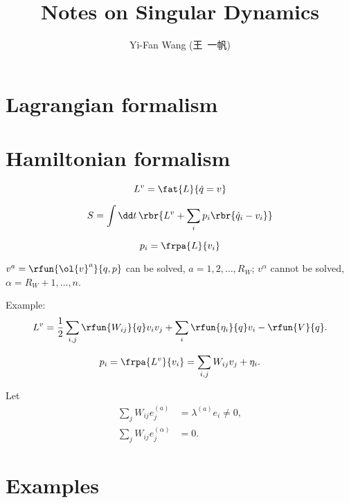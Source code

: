 \documentclass[a4paper,10pt]{article}
\title{Notes on Singular Dynamics}
\author{Yi-Fan Wang (王\ 一帆)}
\begin{document}
\maketitle

\section{Lagrangian formalism}

\section{Hamiltonian formalism}

\begin{equation}
L^v = \fat{L}{\dot{q} = v}
\end{equation}

\begin{equation}
S = \int\dd t\,\rbr{L^v + \sum_i p_i\rbr{\dot{q}_i-v_i}}
\end{equation}

\begin{equation}
p_i = \frpa{L}{v_i}
\end{equation}

$v^a = \rfun{\ol{v}^a}{q,p}$ can be solved, $a = 1, 2, \ldots, R_W$; $v^\alpha$ 
cannot be solved, $\alpha = R_W + 1, \ldots, n$.

Example:
\begin{equation}
L^v = \frac{1}{2} \sum_{i,j}\rfun{W_{ij}}{q} v_i v_j + \sum_i \rfun{\eta_i}{q} 
v_i - \rfun{V}{q}.
\end{equation}

\begin{equation}
p_i = \frpa{L^v}{v_i} = \sum_{i,j} W_{ij} v_j + \eta_i.
\end{equation}

Let
\begin{align}
\sum_j W_{ij} e_j^{(a)} &= \lambda^{(a)} e_i \neq 0, \\
\sum_j W_{ij} e_j^{(\alpha)} &= 0.
\end{align}





\section{Examples}

\printbibliography
\end{document}
